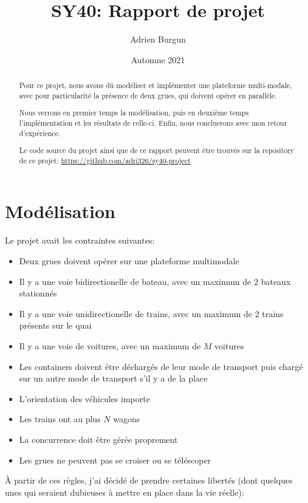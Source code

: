 \documentclass[12pt]{article}
\title{SY40: Rapport de projet}
\author{Adrien Burgun}
\date{Automne 2021}
\begin{document}
\maketitle

\begin{abstract}
    Pour ce projet, nous avons dû modéliser et implémenter une plateforme multi-modale, avec pour particularité la présence de deux grues, qui doivent opérer en parallèle.

    Nous verrons en premier temps la modélisation, puis en deuxième temps l'implémentation et les résultats de celle-ci.
    Enfin, nous concluerons avec mon retour d'expérience.

    Le code source du projet ainsi que de ce rapport peuvent être trouvés sur la repository de ce projet:
    \url{https://github.com/adri326/sy40-project}
\end{abstract}

\newpage
\tableofcontents
\newpage

\section{Modélisation}
\label{sec:modelisation}

Le projet avait les contraintes suivantes:

\begin{itemize}
    \item Deux grues doivent opérer sur une plateforme multimodale
    \item Il y a une voie bidirectionelle de bateau, avec un maximum de $2$ bateaux stationnés
    \item Il y a une voie unidirectionelle de trains, avec un maximum de $2$ trains présents sur le quai
    \item Il y a une voie de voitures, avec un maximum de $M$ voitures
    \item Les containers doivent être déchargés de leur mode de transport puis chargé sur un autre mode de transport s'il y a de la place
    \item L'orientation des véhicules importe
    \item Les trains ont au plus $N$ wagons
    \item La concurrence doit être gérée proprement
    \item Les grues ne peuvent pas se croiser ou se téléscoper
\end{itemize}

À partir de ces règles, j'ai décidé de prendre certaines libertés (dont quelques unes qui seraient dubieuses à mettre en place dans la vie réelle):
\end{document}
